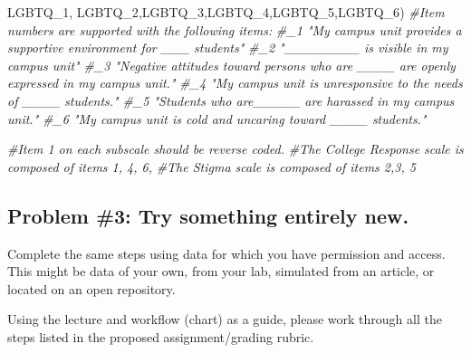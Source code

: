 \documentclass[
  english,
]{book}
\newenvironment{Shaded}{\begin{snugshade}}{\end{snugshade}}
\newcommand{\CommentTok}[1]{\textcolor[rgb]{0.56,0.35,0.01}{\textit{#1}}}
\newcommand{\NormalTok}[1]{#1}
\newcommand{\StringTok}[1]{\textcolor[rgb]{0.31,0.60,0.02}{#1}}
\begin{document}
\begin{Shaded}
\begin{Highlighting}[]
         \StringTok{\textquotesingle{}LGBTQ\_1\textquotesingle{}}\NormalTok{, }\StringTok{\textquotesingle{}LGBTQ\_2\textquotesingle{}}\NormalTok{,}\StringTok{\textquotesingle{}LGBTQ\_3\textquotesingle{}}\NormalTok{,}\StringTok{\textquotesingle{}LGBTQ\_4\textquotesingle{}}\NormalTok{,}\StringTok{\textquotesingle{}LGBTQ\_5\textquotesingle{}}\NormalTok{,}\StringTok{\textquotesingle{}LGBTQ\_6\textquotesingle{}}\NormalTok{)}
\CommentTok{\#Item numbers are supported with the following items:}
\CommentTok{\#\_1 "My campus unit provides a supportive environment for \_\_\_ students"}
\CommentTok{\#\_2 "\_\_\_\_\_\_\_\_ is visible in my campus unit"}
\CommentTok{\#\_3 "Negative attitudes toward persons who are \_\_\_\_ are openly expressed in my campus unit."}
\CommentTok{\#\_4 "My campus unit is unresponsive to the needs of \_\_\_\_ students."}
\CommentTok{\#\_5 "Students who are\_\_\_\_\_ are harassed in my campus unit."}
\CommentTok{\#\_6 "My campus unit is cold and uncaring toward \_\_\_\_ students."}

\CommentTok{\#Item 1 on each subscale should be reverse coded.}
\CommentTok{\#The College Response scale is composed of items 1, 4, 6, }
\CommentTok{\#The Stigma scale is composed of items 2,3, 5}
\end{Highlighting}
\end{Shaded}

\hypertarget{problem-3-try-something-entirely-new.-1}{%
\subsection{Problem \#3: Try something entirely new.}\label{problem-3-try-something-entirely-new.-1}}

Complete the same steps using data for which you have permission and access. This might be data of your own, from your lab, simulated from an article, or located on an open repository.

Using the lecture and workflow (chart) as a guide, please work through all the steps listed in the proposed assignment/grading rubric.
\end{document}
